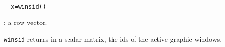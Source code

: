 \begin{mandesc}
  \\ %
\end{mandesc}
\begin{calling_sequence}
\begin{verbatim}
  x=winsid()
\end{verbatim}
\end{calling_sequence}
\begin{parameters}
  \begin{varlist}
    : a row vector.
  \end{varlist}
\end{parameters}
\begin{mandescription}
  \verb!winsid! returns in a scalar matrix, the ids of the active graphic
  windows.
\end{mandescription}

